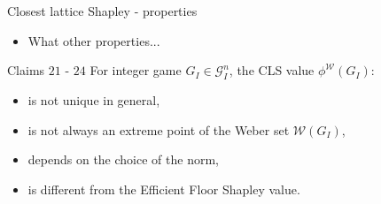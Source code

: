 \documentclass{beamer}
\begin{document}
\begin{frame}{Closest lattice Shapley - properties}

    \begin{itemize}
        \item What other properties...
    \end{itemize}


    \begin{block}{Claims $21$ - $24$}
        For integer game $G_I \in \mathcal{G}_I^n$, the CLS value $\phi^\mathcal{W}(G_I)$:
        \begin{itemize}
            \item is not unique in general,
            \item is not always an extreme point of the Weber set $\mathcal{W}(G_I)$,
            \item depends on the choice of the norm,
            \item is different from the Efficient Floor Shapley value.
        \end{itemize}
    \end{block}
\end{frame}


\end{document}

